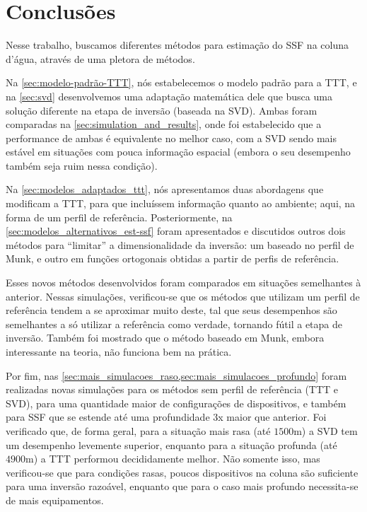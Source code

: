 \section{Conclusões}

Nesse trabalho, buscamos diferentes métodos para estimação do SSF na coluna d'água, através de uma pletora de métodos.

Na \cref{sec:modelo-padrão-TTT}, nós estabelecemos o modelo padrão para a TTT, e na \cref{sec:svd} desenvolvemos uma adaptação matemática dele que busca uma solução diferente na etapa de inversão (baseada na SVD). Ambas foram comparadas na \cref{sec:simulation_and_results}, onde foi estabelecido que a performance de ambas é equivalente no melhor caso, com a SVD sendo mais estável em situações com pouca informação espacial (embora o seu desempenho também seja ruim nessa condição).

Na \cref{sec:modelos_adaptados_ttt}, nós apresentamos duas abordagens que modificam a TTT, para que incluíssem informação  quanto ao ambiente; aqui, na forma de um perfil de referência. Posteriormente, na \cref{sec:modelos_alternativos_est-ssf} foram apresentados e discutidos outros dois métodos para ``limitar'' a dimensionalidade da inversão: um baseado no perfil de Munk, e outro em funções ortogonais obtidas a partir de perfis de referência.

Esses novos métodos desenvolvidos foram comparados em situações semelhantes à anterior. Nessas simulações, verificou-se que os métodos que utilizam um perfil de referência tendem a se aproximar muito deste, tal que seus desempenhos são semelhantes a só utilizar a referência como verdade, tornando fútil a etapa de inversão. Também foi mostrado que o método baseado em Munk, embora interessante na teoria, não funciona bem na prática.

Por fim, nas \cref{sec:mais_simulacoes_raso,sec:mais_simulacoes_profundo} foram realizadas novas simulações para os métodos sem perfil de referência (TTT e SVD), para uma quantidade maior de configurações de dispositivos, e também para SSF que se estende até uma profundidade 3x maior que anterior. Foi verificado que, de forma geral, para a situação mais rasa (até $1500\si{\meter}$) a SVD tem um desempenho levemente superior, enquanto para a situação profunda (até $4900\si{\meter}$) a TTT performou decididamente melhor. Não somente isso, mas verificou-se que para condições rasas, poucos dispositivos na coluna são suficiente para uma inversão razoável, enquanto que para o caso mais profundo necessita-se de mais equipamentos.